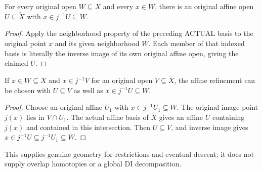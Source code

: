 \begin{corollary}
\label{cor:witt-two-special-fibre-original-affine-refinement}
\leanok
For every original open $W\subseteq X$ and every $x\in W$, there
is an original affine open $U\subseteq\widetilde X$ with
$x\in j^{-1}U\subseteq W$.
\end{corollary}
\begin{proof}
Apply the neighborhood property of the preceding ACTUAL basis
to the original point $x$ and its given neighborhood $W$.
Each member of that indexed basis is literally the inverse
image of its own original affine open, giving the claimed $U$.
\end{proof}

\begin{corollary}
\label{cor:witt-two-special-fibre-original-affine-refinement-below}
\leanok
If $x\in W\subseteq X$ and $x\in j^{-1}V$ for an original
open $V\subseteq\widetilde X$, the affine refinement can be
chosen with $U\subseteq V$ as well as $x\in j^{-1}U\subseteq W$.
\end{corollary}
\begin{proof}
Choose an original affine $U_1$ with $x\in j^{-1}U_1\subseteq W$.
The original image point $j(x)$ lies in $V\cap U_1$. The actual
affine basis of $\widetilde X$ gives an affine $U$ containing
$j(x)$ and contained in this intersection. Then $U\subseteq V$,
and inverse image gives $x\in j^{-1}U\subseteq j^{-1}U_1\subseteq W$.
\end{proof}

This supplies genuine geometry for restrictions and eventual descent;
it does not supply overlap homotopies or a global DI decomposition.
